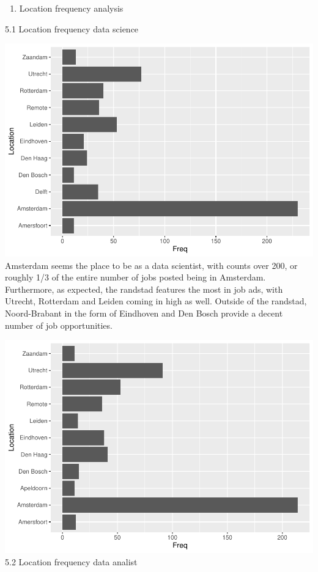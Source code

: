 \documentclass[
]{article}
\providecommand{\tightlist}{%
  \setlength{\itemsep}{0pt}\setlength{\parskip}{0pt}}
\begin{document}
\begin{enumerate}
\def\labelenumi{\arabic{enumi}.}
\setcounter{enumi}{4}
\tightlist
\item
  Location frequency analysis
\end{enumerate}

5.1 Location frequency data science

\includegraphics{analysis_files/figure-latex/unnamed-chunk-27-1.pdf}
Amsterdam seems the place to be as a data scientist, with counts over
200, or roughly 1/3 of the entire number of jobs posted being in
Amsterdam. Furthermore, as expected, the randstad features the most in
job ads, with Utrecht, Rotterdam and Leiden coming in high as well.
Outside of the randstad, Noord-Brabant in the form of Eindhoven and Den
Bosch provide a decent number of job opportunities.

\includegraphics{analysis_files/figure-latex/unnamed-chunk-28-1.pdf} 5.2
Location frequency data analist
\end{document}
